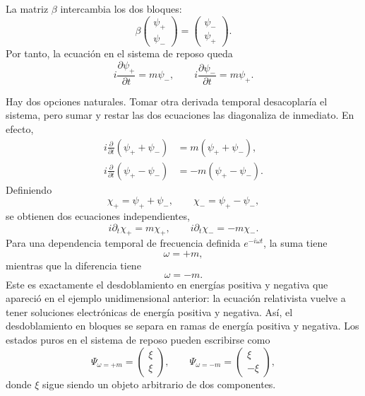 La matriz \(\beta\) intercambia los dos bloques:
\begin{equation}
\beta
\begin{pmatrix}
\psi_+\\
\psi_-
\end{pmatrix}
=
\begin{pmatrix}
\psi_-\\
\psi_+
\end{pmatrix}.
\end{equation}
Por tanto, la ecuación en el sistema de reposo queda
\begin{equation}
i\frac{\partial\psi_+}{\partial t}=m\psi_-,
\qquad
i\frac{\partial\psi_-}{\partial t}=m\psi_+.
\end{equation}

Hay dos opciones naturales. Tomar otra derivada temporal desacoplaría el sistema, pero sumar y restar las dos ecuaciones las diagonaliza de inmediato. En efecto,
\begin{align}
i\frac{\partial}{\partial t}(\psi_++\psi_-)
&=m(\psi_++\psi_-),\\
i\frac{\partial}{\partial t}(\psi_+-\psi_-)
&=-m(\psi_+-\psi_-).
\end{align}
Definiendo
\begin{equation}
\chi_+=\psi_++\psi_-,
\qquad
\chi_-=\psi_+-\psi_-,
\end{equation}
se obtienen dos ecuaciones independientes,
\begin{equation}
i\partial_t\chi_+=m\chi_+,
\qquad
i\partial_t\chi_-=-m\chi_-.
\end{equation}
Para una dependencia temporal de frecuencia definida \(e^{-i\omega t}\), la suma tiene
\begin{equation}
\omega=+m,
\end{equation}
mientras que la diferencia tiene
\begin{equation}
\omega=-m.
\end{equation}
Este es exactamente el desdoblamiento en energías positiva y negativa que apareció en el ejemplo unidimensional anterior: la ecuación relativista vuelve a tener soluciones electrónicas de energía positiva y negativa. Así, el desdoblamiento en bloques se separa en ramas de energía positiva y negativa. Los estados puros en el sistema de reposo pueden escribirse como
\begin{equation}
\Psi_{\omega=+m}=
\begin{pmatrix}
\xi\\
\xi
\end{pmatrix},
\qquad
\Psi_{\omega=-m}=
\begin{pmatrix}
\xi\\
-\xi
\end{pmatrix},
\end{equation}
donde \(\xi\) sigue siendo un objeto arbitrario de dos componentes.

